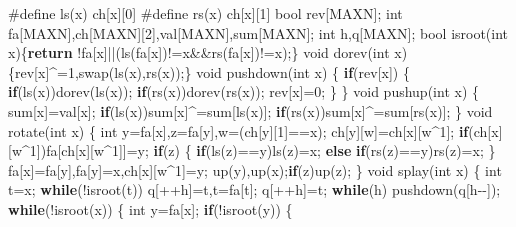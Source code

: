 \documentclass[
]{article}
\newenvironment{Shaded}{}{}
\newcommand{\ControlFlowTok}[1]{\textcolor[rgb]{0.00,0.44,0.13}{\textbf{#1}}}
\newcommand{\DataTypeTok}[1]{\textcolor[rgb]{0.56,0.13,0.00}{#1}}
\newcommand{\DecValTok}[1]{\textcolor[rgb]{0.25,0.63,0.44}{#1}}
\newcommand{\NormalTok}[1]{#1}
\newcommand{\PreprocessorTok}[1]{\textcolor[rgb]{0.74,0.48,0.00}{#1}}
\begin{document}
\begin{Shaded}
\begin{Highlighting}[]
\PreprocessorTok{\#define ls}\NormalTok{(x)}\PreprocessorTok{ }\NormalTok{ch[x][}\DecValTok{0}\NormalTok{]}
\PreprocessorTok{\#define rs}\NormalTok{(x)}\PreprocessorTok{ }\NormalTok{ch[x][}\DecValTok{1}\NormalTok{]}
\DataTypeTok{bool}\NormalTok{ rev[MAXN];}
\DataTypeTok{int}\NormalTok{ fa[MAXN],ch[MAXN][}\DecValTok{2}\NormalTok{],val[MAXN],sum[MAXN];}
\DataTypeTok{int}\NormalTok{ h,q[MAXN];}
\DataTypeTok{bool}\NormalTok{ isroot(}\DataTypeTok{int}\NormalTok{ x)\{}\ControlFlowTok{return}\NormalTok{ !fa[x]||(ls(fa[x])!=x\&\&rs(fa[x])!=x);\}}
\DataTypeTok{void}\NormalTok{ dorev(}\DataTypeTok{int}\NormalTok{ x)\{rev[x]\^{}=}\DecValTok{1}\NormalTok{,swap(ls(x),rs(x));\}}
\DataTypeTok{void}\NormalTok{ pushdown(}\DataTypeTok{int}\NormalTok{ x)}
\NormalTok{\{}
    \ControlFlowTok{if}\NormalTok{(rev[x])}
\NormalTok{    \{}
        \ControlFlowTok{if}\NormalTok{(ls(x))dorev(ls(x));}
        \ControlFlowTok{if}\NormalTok{(rs(x))dorev(rs(x));}
\NormalTok{        rev[x]=}\DecValTok{0}\NormalTok{;}
\NormalTok{    \}}
\NormalTok{\}}
\DataTypeTok{void}\NormalTok{ pushup(}\DataTypeTok{int}\NormalTok{ x)}
\NormalTok{\{   }
\NormalTok{    sum[x]=val[x];}
    \ControlFlowTok{if}\NormalTok{(ls(x))sum[x]\^{}=sum[ls(x)];}
    \ControlFlowTok{if}\NormalTok{(rs(x))sum[x]\^{}=sum[rs(x)];}
\NormalTok{\}}
\DataTypeTok{void}\NormalTok{ rotate(}\DataTypeTok{int}\NormalTok{ x)}
\NormalTok{\{}
    \DataTypeTok{int}\NormalTok{ y=fa[x],z=fa[y],w=(ch[y][}\DecValTok{1}\NormalTok{]==x);}
\NormalTok{    ch[y][w]=ch[x][w\^{}}\DecValTok{1}\NormalTok{];}
    \ControlFlowTok{if}\NormalTok{(ch[x][w\^{}}\DecValTok{1}\NormalTok{])fa[ch[x][w\^{}}\DecValTok{1}\NormalTok{]]=y;}
    \ControlFlowTok{if}\NormalTok{(z)}
\NormalTok{    \{}
        \ControlFlowTok{if}\NormalTok{(ls(z)==y)ls(z)=x;}
        \ControlFlowTok{else} \ControlFlowTok{if}\NormalTok{(rs(z)==y)rs(z)=x;}
\NormalTok{    \}}
\NormalTok{    fa[x]=fa[y],fa[y]=x,ch[x][w\^{}}\DecValTok{1}\NormalTok{]=y;}
\NormalTok{    up(y),up(x);}\ControlFlowTok{if}\NormalTok{(z)up(z);}
\NormalTok{\}}
\DataTypeTok{void}\NormalTok{ splay(}\DataTypeTok{int}\NormalTok{ x)}
\NormalTok{\{}
    \DataTypeTok{int}\NormalTok{ t=x; }\ControlFlowTok{while}\NormalTok{(!isroot(t)) q[++h]=t,t=fa[t]; q[++h]=t;}
    \ControlFlowTok{while}\NormalTok{(h) pushdown(q[h{-}{-}]);}
    \ControlFlowTok{while}\NormalTok{(!isroot(x))}
\NormalTok{    \{}
        \DataTypeTok{int}\NormalTok{ y=fa[x];}
        \ControlFlowTok{if}\NormalTok{(!isroot(y))}
\NormalTok{        \{}

\end{Highlighting}
\end{Shaded}
\end{document}

